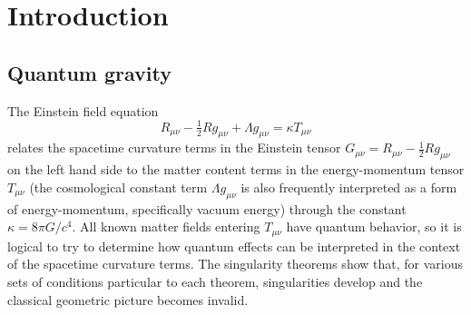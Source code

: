 \documentclass[11pt,letterpaper]{article}
\begin{document}
\section{Introduction}
\label{sec:intro}

\subsection{Quantum gravity}

The Einstein field equation
\begin{equation}
R_{\mu\nu}-\tfrac{1}{2}Rg_{\mu\nu}+\Lambda g_{\mu\nu}=\kappa T_{\mu\nu}
\label{eq:efe}
\end{equation}
relates the spacetime curvature terms in the Einstein tensor $G_{\mu\nu}=R_{\mu\nu}-\tfrac12 R g_{\mu\nu}$ on the left hand side to the matter content terms in the energy-momentum tensor $T_{\mu\nu}$ (the cosmological constant term $\Lambda g_{\mu\nu}$ is also frequently interpreted as a form of energy-momentum, specifically vacuum energy) through the constant $\kappa=8\pi G/c^{4}$. All known matter fields entering $T_{\mu\nu}$ have quantum behavior, so it is logical to try to determine how quantum effects can be interpreted in the context of the spacetime curvature terms. The singularity theorems \cite{Penrose1965,HawkingPenrose1970} show that, for various sets of conditions particular to each theorem, singularities develop and the classical geometric picture becomes invalid.
\end{document}
